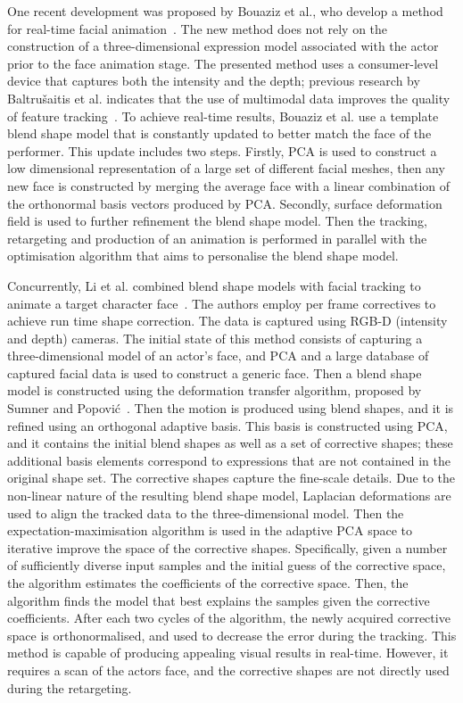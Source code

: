 \documentclass[11pt]{report}
\begin{document}
One recent development was proposed by Bouaziz et al., who develop a method for real-time facial animation~\cite{Bouaziz:2013}. The new method does not rely on the construction of a three-dimensional expression model  associated with the actor prior to the face animation stage. The presented method uses a consumer-level device that captures both the intensity and the depth; previous research by Baltru\v{s}aitis et al. indicates that the use of multimodal data improves the quality of feature tracking~\cite{Baltrusaitis:2012}. To achieve real-time results, Bouaziz et al. use a template blend shape model that is constantly updated to better match the face of the performer. This update includes two steps. Firstly, PCA is used to construct a low dimensional representation of a large set of different facial meshes, then any new face is constructed by merging the average face with a linear combination of the orthonormal basis vectors produced by PCA. Secondly, surface deformation field is used to further refinement the blend shape model. Then the tracking, retargeting and production of an animation is performed in parallel with the optimisation algorithm that aims to personalise the blend shape model. 

Concurrently, Li et al. combined blend shape models with facial tracking to animate a target character face~\cite{Li:2013}. The authors employ per frame correctives to achieve run time shape correction. The data is captured using RGB-D (intensity and depth) cameras. The initial state of this method consists of capturing a three-dimensional model of an actor's face, and PCA  and a large database of captured facial data is used to construct a generic face. Then a blend shape model is constructed using the deformation transfer algorithm, proposed by Sumner and Popovi\'{c}~\cite{Sumner:2004}. Then the motion is produced using blend shapes, and it is refined using an orthogonal adaptive basis. This basis is constructed using PCA, and it contains the initial blend shapes as well as a set of corrective shapes; these additional basis elements correspond to expressions that are not contained in the original shape set. The corrective shapes capture the fine-scale details. Due to the non-linear nature of the resulting blend shape model, Laplacian deformations are used to align the tracked data to the three-dimensional model. Then the expectation-maximisation algorithm is used in the adaptive PCA space to iterative improve the space of the corrective shapes. Specifically, given a number of sufficiently diverse input samples and the initial guess of the corrective space, the algorithm estimates the coefficients of the corrective space. Then, the algorithm finds the model that best explains the samples given the corrective coefficients. After each two cycles of the algorithm, the newly acquired corrective space is orthonormalised, and used to decrease the error during the tracking. This method is capable of producing appealing visual results in real-time. However, it requires a scan of the actors face, and the corrective shapes are not directly used during the retargeting.
\end{document}
